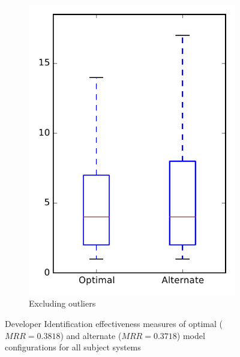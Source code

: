 \begin{figure}
\begin{subfigure}{.4\textwidth}
        \includegraphics[height=0.4\textheight]{figures/combo/dit_rq1_all_no_outlier}
        \caption{Excluding outliers}\label{fig:combo:dit:rq1:all_no_outlier}
    \end{subfigure}
\caption[Developer Identification effectiveness measures of optimal and alternate model configurations for all subject systems]%
{Developer Identification effectiveness measures of optimal ($MRR=0.3818$) and alternate ($MRR=0.3718$) model configurations for all subject systems}
\label{fig:combo:dit:rq1:all}
\end{figure}
